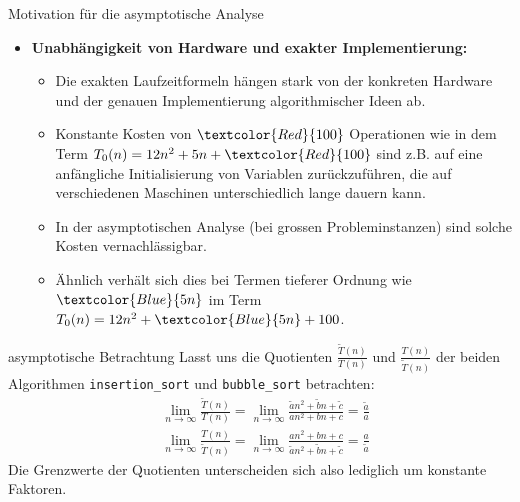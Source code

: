 \begin{frame}{Motivation für die asymptotische Analyse}
	\begin{itemize}[<+->]
		\item \textbf{Unabhängigkeit von Hardware und exakter Implementierung:}
		\begin{itemize}
			\item Die exakten Laufzeitformeln hängen stark von der konkreten Hardware und der genauen Implementierung algorithmischer Ideen ab.
			\item Konstante Kosten von $\textcolor{Red}{100}$ Operationen wie in dem Term $T_0(n) = 12n^2 + 5n + \textcolor{Red}{100}$ sind z.B. auf eine anfängliche Initialisierung von Variablen zurückzuführen, die auf verschiedenen Maschinen unterschiedlich lange dauern kann.
			\item In der asymptotischen Analyse (bei grossen Probleminstanzen) sind solche Kosten vernachlässigbar.
			\item Ähnlich verhält sich dies bei Termen tieferer Ordnung wie $\textcolor{Blue}{5n}$ im Term $T_0(n) = 12n^2 + \textcolor{Blue}{5n} + 100$.
		\end{itemize}
	\end{itemize}
\end{frame}

\begin{frame}{asymptotische Betrachtung}
	Lasst uns die Quotienten $\frac{\tilde{T}(n)}{T(n)}$ und $\frac{T(n)}{\tilde{T}(n)}$ der beiden Algorithmen \texttt{insertion\_sort} und \texttt{bubble\_sort} betrachten:
	\begin{align*}
		 & \lim_{n\to\infty}\frac{\tilde{T}(n)}{T(n)} = \lim_{n\to\infty}\frac{\tilde{a}n^2 + \tilde{b}n + \tilde{c}}{an^2 + bn + c} =\frac{\tilde{a}}{a}
	\end{align*}
	\begin{align*}
		 & \lim_{n\to\infty}\frac{T(n)}{\tilde{T}(n)} = \lim_{n\to\infty}\frac{an^2 + bn + c}{\tilde{a}n^2 + \tilde{b}n + \tilde{c}} =\frac{a}{\tilde{a}}
	\end{align*}
	Die Grenzwerte der Quotienten unterscheiden sich also lediglich um konstante Faktoren.
\end{frame}


